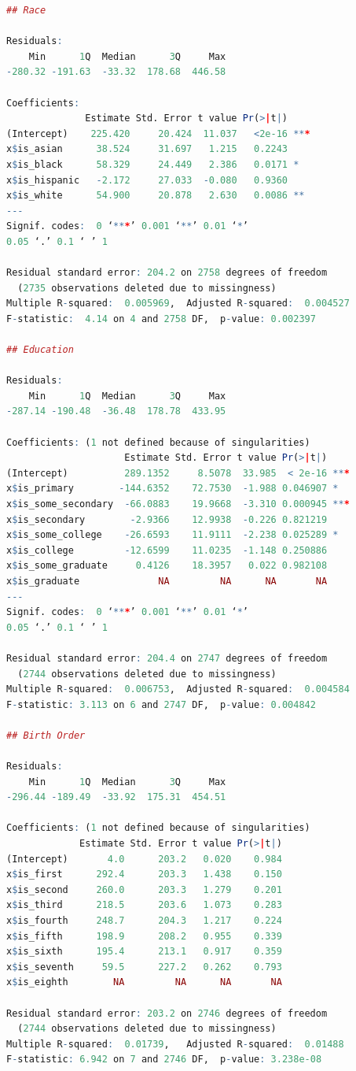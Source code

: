 \documentclass[12pt]{elsarticle}
\begin{document}
\begin{lstlisting}[language=R]
## Race

Residuals:
    Min      1Q  Median      3Q     Max
-280.32 -191.63  -33.32  178.68  446.58

Coefficients:
              Estimate Std. Error t value Pr(>|t|)
(Intercept)    225.420     20.424  11.037   <2e-16 ***
x$is_asian      38.524     31.697   1.215   0.2243
x$is_black      58.329     24.449   2.386   0.0171 *
x$is_hispanic   -2.172     27.033  -0.080   0.9360
x$is_white      54.900     20.878   2.630   0.0086 **
---
Signif. codes:  0 ‘***’ 0.001 ‘**’ 0.01 ‘*’
0.05 ‘.’ 0.1 ‘ ’ 1

Residual standard error: 204.2 on 2758 degrees of freedom
  (2735 observations deleted due to missingness)
Multiple R-squared:  0.005969,	Adjusted R-squared:  0.004527
F-statistic:  4.14 on 4 and 2758 DF,  p-value: 0.002397

## Education

Residuals:
    Min      1Q  Median      3Q     Max
-287.14 -190.48  -36.48  178.78  433.95

Coefficients: (1 not defined because of singularities)
                     Estimate Std. Error t value Pr(>|t|)
(Intercept)          289.1352     8.5078  33.985  < 2e-16 ***
x$is_primary        -144.6352    72.7530  -1.988 0.046907 *
x$is_some_secondary  -66.0883    19.9668  -3.310 0.000945 ***
x$is_secondary        -2.9366    12.9938  -0.226 0.821219
x$is_some_college    -26.6593    11.9111  -2.238 0.025289 *
x$is_college         -12.6599    11.0235  -1.148 0.250886
x$is_some_graduate     0.4126    18.3957   0.022 0.982108
x$is_graduate              NA         NA      NA       NA
---
Signif. codes:  0 ‘***’ 0.001 ‘**’ 0.01 ‘*’
0.05 ‘.’ 0.1 ‘ ’ 1

Residual standard error: 204.4 on 2747 degrees of freedom
  (2744 observations deleted due to missingness)
Multiple R-squared:  0.006753,	Adjusted R-squared:  0.004584
F-statistic: 3.113 on 6 and 2747 DF,  p-value: 0.004842

## Birth Order

Residuals:
    Min      1Q  Median      3Q     Max
-296.44 -189.49  -33.92  175.31  454.51

Coefficients: (1 not defined because of singularities)
             Estimate Std. Error t value Pr(>|t|)
(Intercept)       4.0      203.2   0.020    0.984
x$is_first      292.4      203.3   1.438    0.150
x$is_second     260.0      203.3   1.279    0.201
x$is_third      218.5      203.6   1.073    0.283
x$is_fourth     248.7      204.3   1.217    0.224
x$is_fifth      198.9      208.2   0.955    0.339
x$is_sixth      195.4      213.1   0.917    0.359
x$is_seventh     59.5      227.2   0.262    0.793
x$is_eighth        NA         NA      NA       NA

Residual standard error: 203.2 on 2746 degrees of freedom
  (2744 observations deleted due to missingness)
Multiple R-squared:  0.01739,	Adjusted R-squared:  0.01488
F-statistic: 6.942 on 7 and 2746 DF,  p-value: 3.238e-08
\end{lstlisting}
\end{document}
